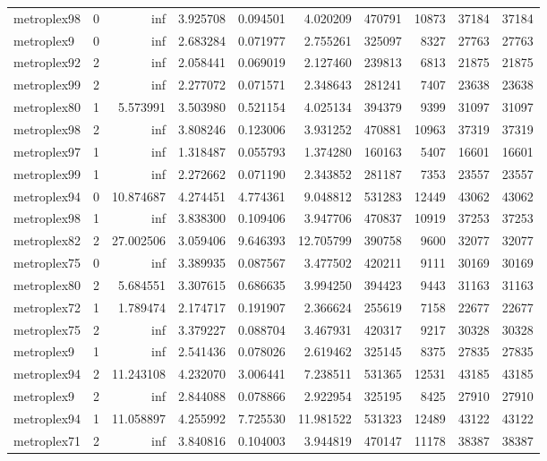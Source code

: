 \begin{longtable}{|l|r|r|r|r|r|r|r|r|r|}
metroplex98 & 0 & inf & 3.925708 & 0.094501 & 4.020209 & 470791 & 10873 & 37184 & 37184 \\
metroplex9 & 0 & inf & 2.683284 & 0.071977 & 2.755261 & 325097 & 8327 & 27763 & 27763 \\
metroplex92 & 2 & inf & 2.058441 & 0.069019 & 2.127460 & 239813 & 6813 & 21875 & 21875 \\
metroplex99 & 2 & inf & 2.277072 & 0.071571 & 2.348643 & 281241 & 7407 & 23638 & 23638 \\
metroplex80 & 1 & 5.573991 & 3.503980 & 0.521154 & 4.025134 & 394379 & 9399 & 31097 & 31097 \\
metroplex98 & 2 & inf & 3.808246 & 0.123006 & 3.931252 & 470881 & 10963 & 37319 & 37319 \\
metroplex97 & 1 & inf & 1.318487 & 0.055793 & 1.374280 & 160163 & 5407 & 16601 & 16601 \\
metroplex99 & 1 & inf & 2.272662 & 0.071190 & 2.343852 & 281187 & 7353 & 23557 & 23557 \\
metroplex94 & 0 & 10.874687 & 4.274451 & 4.774361 & 9.048812 & 531283 & 12449 & 43062 & 43062 \\
metroplex98 & 1 & inf & 3.838300 & 0.109406 & 3.947706 & 470837 & 10919 & 37253 & 37253 \\
metroplex82 & 2 & 27.002506 & 3.059406 & 9.646393 & 12.705799 & 390758 & 9600 & 32077 & 32077 \\
metroplex75 & 0 & inf & 3.389935 & 0.087567 & 3.477502 & 420211 & 9111 & 30169 & 30169 \\
metroplex80 & 2 & 5.684551 & 3.307615 & 0.686635 & 3.994250 & 394423 & 9443 & 31163 & 31163 \\
metroplex72 & 1 & 1.789474 & 2.174717 & 0.191907 & 2.366624 & 255619 & 7158 & 22677 & 22677 \\
metroplex75 & 2 & inf & 3.379227 & 0.088704 & 3.467931 & 420317 & 9217 & 30328 & 30328 \\
metroplex9 & 1 & inf & 2.541436 & 0.078026 & 2.619462 & 325145 & 8375 & 27835 & 27835 \\
metroplex94 & 2 & 11.243108 & 4.232070 & 3.006441 & 7.238511 & 531365 & 12531 & 43185 & 43185 \\
metroplex9 & 2 & inf & 2.844088 & 0.078866 & 2.922954 & 325195 & 8425 & 27910 & 27910 \\
metroplex94 & 1 & 11.058897 & 4.255992 & 7.725530 & 11.981522 & 531323 & 12489 & 43122 & 43122 \\
metroplex71 & 2 & inf & 3.840816 & 0.104003 & 3.944819 & 470147 & 11178 & 38387 & 38387 \\

\end{longtable}
